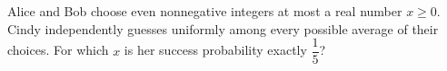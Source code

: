 Alice and Bob choose even nonnegative integers at most a real number $x\ge0$. Cindy independently guesses uniformly among every possible average of their choices. For which $x$ is her success probability exactly $\dfrac{1}{5}$?
